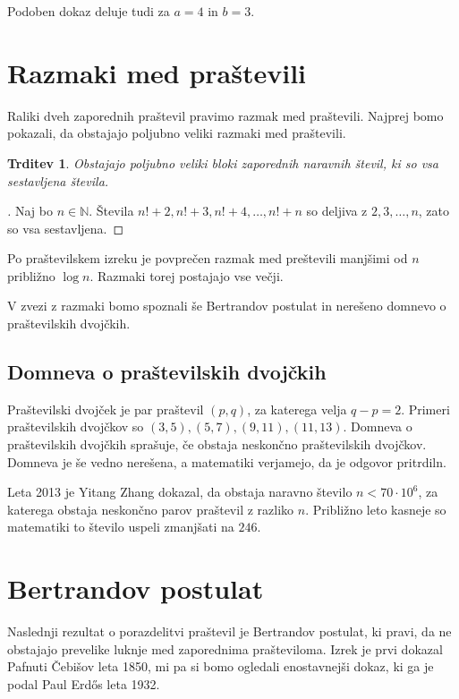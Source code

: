 \documentclass[a4paper,12pt]{article}
\def\N{\mathbb{N}}
\theoremstyle{definition}
\theoremstyle{plain}
\newtheorem{trditev}{Trditev}
\newenvironment{dokaz}{\begin{proof}[\bfseries\upshape\proofname]}{\end{proof}}
\begin{document}
Podoben dokaz deluje tudi za $a = 4$ in $b = 3$.



\section{Razmaki med praštevili}
Raliki dveh zaporednih praštevil pravimo razmak med praštevili. Najprej bomo pokazali, da obstajajo poljubno veliki razmaki med praštevili.

\begin{trditev}
    Obstajajo poljubno veliki bloki zaporednih naravnih števil, ki so vsa sestavljena števila.
\end{trditev}
\begin{dokaz}
    Naj bo $n \in \N$. Števila $n! + 2, n! + 3, n! + 4, \ldots, n! + n$ so deljiva z $2, 3, \ldots, n$, zato so vsa sestavljena.
\end{dokaz}

Po praštevilskem izreku je povprečen razmak med preštevili manjšimi od $n$ približno $\log{n}$. Razmaki torej postajajo vse večji.

V zvezi z razmaki bomo spoznali še Bertrandov postulat in nerešeno domnevo o praštevilskih dvojčkih.

\subsection{Domneva o praštevilskih dvojčkih}
Praštevilski dvojček je par praštevil $(p, q)$, za katerega velja $q - p = 2$. Primeri praštevilskih dvojčkov so $(3, 5), (5, 7), (9, 11), (11, 13)$. Domneva o praštevilskih dvojčkih sprašuje, če obstaja neskončno praštevilskih dvojčkov. Domneva je še vedno nerešena, a matematiki verjamejo, da je odgovor pritrdiln.

Leta 2013 je Yitang Zhang dokazal, da obstaja naravno število $n < 70 \cdot 10^6$, za katerega obstaja neskončno parov praštevil z razliko $n$. Približno leto kasneje so matematiki to število uspeli zmanjšati na $246$.






\section{Bertrandov postulat}
Naslednji rezultat o porazdelitvi praštevil je Bertrandov postulat, ki pravi, da ne obstajajo prevelike luknje med zaporednima prašteviloma. Izrek je prvi dokazal Pafnuti Čebišov leta 1850, mi pa si bomo ogledali enostavnejši dokaz, ki ga je podal Paul Erd\H{o}s leta 1932.
\end{document}
